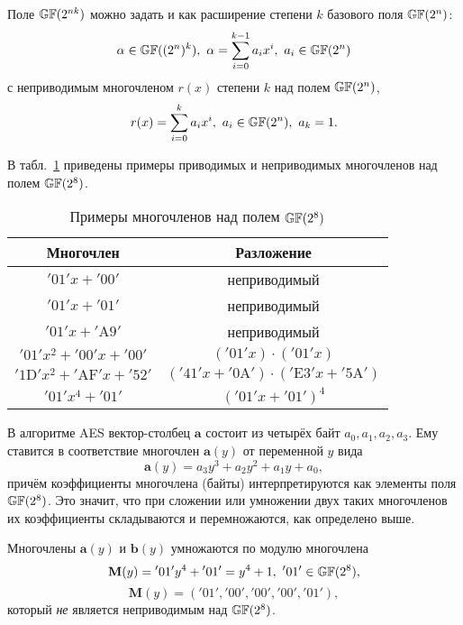 Поле $\mathbb{GF}(2^{nk})$ можно задать и как расширение степени $k$ базового поля $\mathbb{GF}(2^n)$:
    \[ \alpha \in \mathbb{GF}((2^n)^k), ~ \alpha = \sum\limits_{i=0}^{k-1} a_i x^i, ~ a_i \in \mathbb{GF}(2^n) \]
с неприводимым многочленом $r(x)$ степени $k$ над полем $\mathbb{GF}(2^n)$,
    \[ r(x) = \sum\limits_{i=0}^{k} a_i x^i, ~ a_i \in \mathbb{GF}(2^n), ~ a_k = 1. \]

\example
В табл.~\ref{tab:irreducible-gf8} приведены примеры приводимых и неприводимых многочленов над полем $\mathbb{GF}(2^8)$.
\begin{table}[!ht]
    \centering
    \caption{Примеры многочленов над полем $\mathbb{GF}(2^8)$\label{tab:irreducible-gf8}}
    \begin{tabular}{|c|c|}
        \hline
        Многочлен & Разложение \\
        \hline
        $\mathrm{'01'} x + \mathrm{'00'}$ & неприводимый \\
        $\mathrm{'01'} x + \mathrm{'01'}$ & неприводимый \\
        $\mathrm{'01'} x + \mathrm{'A9'}$ & неприводимый \\
        $\mathrm{'01'} x^2 + \mathrm{'00'} x + \mathrm{'00'}$ & $(\mathrm{'01'} x) \cdot (\mathrm{'01'} x)$ \\
        $\mathrm{'1D'} x^2 + \mathrm{'AF'} x + \mathrm{'52'}$ & $(\mathrm{'41'} x + \mathrm{'0A'}) \cdot (\mathrm{'E3'} x + \mathrm{'5A'})$ \\
        $\mathrm{'01'} x^4 + \mathrm{'01'}$ & $(\mathrm{'01'} x + \mathrm{'01'})^4$ \\
        \hline
    \end{tabular}
\end{table}
\exampleend

В алгоритме AES вектор-столбец $\mathbf{a}$ состоит из четырёх байт $a_{0}, a_{1}, a_{2}, a_{3}$. Ему ставится в соответствие многочлен $\mathbf{a}(y)$ от переменной $y$ вида
    \[ \mathbf{a}(y) = a_{3}y^{3}+a_{2}y^{2}+a_{1}y+a_{0}, \]
причём коэффициенты многочлена (байты) интерпретируются как элементы поля $\mathbb{GF}(2^{8})$. Это значит, что при сложении или умножении двух таких многочленов их коэффициенты складываются и перемножаются, как определено выше.

Многочлены $\mathbf{a}(y)$ и $\mathbf{b}(y)$ умножаются по модулю многочлена
    \[ \mathbf{M}(y)= \mathrm{'01'} y^4 + \mathrm{'01'} = y^4 + 1, ~ \mathrm{'01'} \in \mathbb{GF}(2^8), \]
    \[ \mathbf{M}(y)= (\mathrm{'01'}, \mathrm{'00'},\mathrm{'00'}, \mathrm{'00'}, \mathrm{'01'}), \]
который \emph{не} является неприводимым над $\mathbb{GF}(2^8)$.

